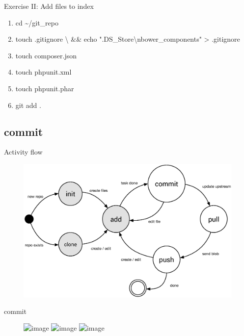 \documentclass{beamer}
\begin{document}
\begin{frame}{Exercise II: Add files to index}
    \begin{enumerate}[\$]
        \item<1-> cd  \textasciitilde/git\_repo
        \item<2-> touch .gitignore {\textbackslash} \newline
            \&\& echo ".DS\_Store{\textbackslash}nbower\_components" > .gitignore
        \item<3-> touch composer.json
        \item<3-> touch phpunit.xml
        \item<3-> touch phpunit.phar
        \item<4-> git add .
    \end{enumerate}
    
\end{frame}

\subsection[commit]{commit}
\begin{frame}{Activity flow}
    \begin{figure}
        \center
        \includegraphics[width=.9\textwidth]{git-command-flow-2}
        \label{fig:git-command-flow-2}
    \end{figure}
\end{frame}

\begin{frame}{commit}
    \begin{figure}
        \center
        \includegraphics<1>[width=.8\textwidth]{project-changed-0}
        \includegraphics<2>[width=.8\textwidth]{project-changed-1}
        \includegraphics<3>[width=.8\textwidth]{project-changed-2}
        \label{fig:project-changed-2}
    \end{figure}
\end{frame}
\end{document}
